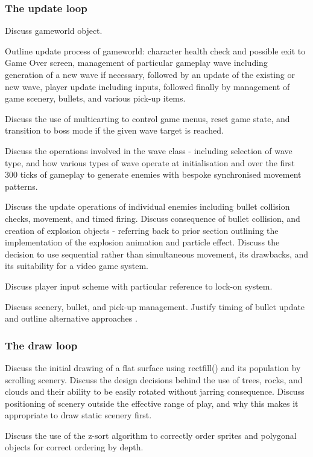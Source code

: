 \documentclass{article}
\begin{document}
\subsubsection*{The update loop}
Discuss gameworld object.

Outline update process of gameworld: character health check and possible exit to Game Over screen,
management of particular gameplay wave including generation of a new wave if necessary, followed by
an update of the existing or new wave, player update including inputs, followed finally by management
of game scenery, bullets, and various pick-up items.

Discuss the use of multicarting to control game menus, reset game state, and transition to boss mode
if the given wave target is reached.

Discuss the operations involved in the wave class - including selection of wave type, and how various
types of wave operate at initialisation and over the first 300 ticks of gameplay to generate enemies
with bespoke synchronised movement patterns.

Discuss the update operations of individual enemies including bullet collision checks, movement, and
timed firing. Discuss consequence of bullet collision, and creation of explosion objects - referring back
to prior section outlining the implementation of the explosion animation and particle effect. Discuss
the decision to use sequential rather than simultaneous movement, its drawbacks, and its suitability for
a video game system.\cite[p. 16]{ericson}

Discuss player input scheme with particular reference to lock-on system.

Discuss scenery, bullet, and pick-up management. Justify timing of bullet update and outline alternative
approaches \cite{nystrom}.
\subsubsection*{The draw loop}
Discuss the initial drawing of a flat surface using rectfill() and its population by scrolling scenery.
Discuss the design decisions behind the use of trees, rocks, and clouds and their ability to be easily
rotated without jarring consequence. Discuss positioning of scenery outside the effective range of
play, and why this makes it appropriate to draw static scenery first.

Discuss the use of the z-sort algorithm to correctly order sprites and polygonal objects
for correct ordering by depth. 
\end{document}
